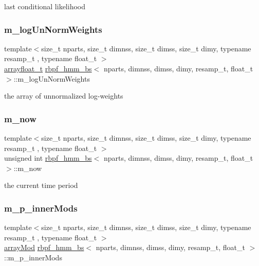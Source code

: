 last conditional likelihood \mbox{\label{classrbpf__hmm__bs_a9a0c878d809b4e8b4c0f496a0eb750d1}} 
\subsubsection{\texorpdfstring{m\+\_\+log\+Un\+Norm\+Weights}{m\_logUnNormWeights}}
{\footnotesize\ttfamily template$<$size\+\_\+t nparts, size\+\_\+t dimnss, size\+\_\+t dimss, size\+\_\+t dimy, typename resamp\+\_\+t , typename float\+\_\+t $>$ \\
\hyperlink{classrbpf__hmm__bs_aa2dd927bb65838210f0d177b360606dc}{arrayfloat\+\_\+t} \hyperlink{classrbpf__hmm__bs}{rbpf\+\_\+hmm\+\_\+bs}$<$ nparts, dimnss, dimss, dimy, resamp\+\_\+t, float\+\_\+t $>$\+::m\+\_\+log\+Un\+Norm\+Weights\hspace{0.3cm}{\ttfamily [private]}}

the array of unnormalized log-\/weights \mbox{\label{classrbpf__hmm__bs_a9cc25241290c1a51a9b1c5c945ece110}} 
\subsubsection{\texorpdfstring{m\+\_\+now}{m\_now}}
{\footnotesize\ttfamily template$<$size\+\_\+t nparts, size\+\_\+t dimnss, size\+\_\+t dimss, size\+\_\+t dimy, typename resamp\+\_\+t , typename float\+\_\+t $>$ \\
unsigned int \hyperlink{classrbpf__hmm__bs}{rbpf\+\_\+hmm\+\_\+bs}$<$ nparts, dimnss, dimss, dimy, resamp\+\_\+t, float\+\_\+t $>$\+::m\+\_\+now\hspace{0.3cm}{\ttfamily [private]}}

the current time period \mbox{\label{classrbpf__hmm__bs_a3065666fdfb60baf45c52018acfade99}} 
\subsubsection{\texorpdfstring{m\+\_\+p\+\_\+inner\+Mods}{m\_p\_innerMods}}
{\footnotesize\ttfamily template$<$size\+\_\+t nparts, size\+\_\+t dimnss, size\+\_\+t dimss, size\+\_\+t dimy, typename resamp\+\_\+t , typename float\+\_\+t $>$ \\
\hyperlink{classrbpf__hmm__bs_aa91b72fcbb93f89eade623504eaac11b}{array\+Mod} \hyperlink{classrbpf__hmm__bs}{rbpf\+\_\+hmm\+\_\+bs}$<$ nparts, dimnss, dimss, dimy, resamp\+\_\+t, float\+\_\+t $>$\+::m\+\_\+p\+\_\+inner\+Mods\hspace{0.3cm}{\ttfamily [private]}}

